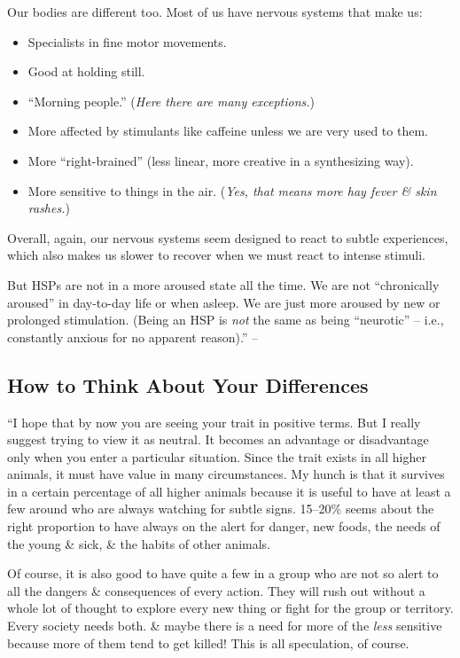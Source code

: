 \documentclass{article}
\numberwithin{equation}{section}
\begin{document}
Our bodies are different too. Most of us have nervous systems that make us:
\begin{itemize}
	\item Specialists in fine motor movements.
	\item Good at holding still.
	\item ``Morning people.'' (\textit{Here there are many exceptions.})
	\item More affected by stimulants like caffeine unless we are very used to them.
	\item More ``right-brained'' (less linear, more creative in a synthesizing way).
	\item More sensitive to things in the air. (\textit{Yes, that means more hay fever \& skin rashes.})
\end{itemize}
Overall, again, our nervous systems seem designed to react to subtle experiences, which also makes us slower to recover when we must react to intense stimuli.

But HSPs are not in a more aroused state all the time. We are not ``chronically aroused'' in day-to-day life or when asleep. We are just more aroused by new or prolonged stimulation. (Being an HSP is \textit{not} the same as being ``neurotic'' -- i.e., constantly anxious for no apparent reason).'' -- \cite[pp. 44--45]{Aron2013}

\subsection{How to Think About Your Differences}
``I hope  that by now you are seeing your trait in positive terms. But I really suggest trying to view it as neutral. It becomes an advantage or disadvantage only when you enter a particular situation. Since the trait exists in all higher animals, it must have value in many circumstances. My hunch is that it survives in a certain percentage of all higher animals because it is useful to have at least a few around who are always watching for subtle signs. 15--20\% seems about the right proportion to have always on the alert for danger, new foods, the needs of the young \& sick, \& the habits of other animals.

Of course, it is also good to have quite a few in a group who are not so alert to all the dangers \& consequences of every action. They will rush out without a whole lot of thought to explore every new thing or fight for the group or territory. Every society needs both. \& maybe there is a need for more of the \textit{less} sensitive because more of them tend to get killed! This is all speculation, of course.
\end{document}
